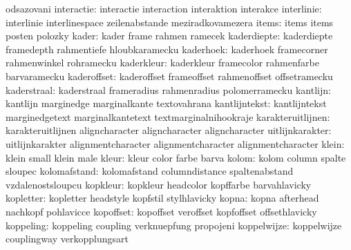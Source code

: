                        odsazovani
          interactie:  interactie           interaction          interaktion
                       interakce
          interlinie:  interlinie           interlinespace       zeilenabstande
                       meziradkovamezera
               items:  items                items                posten
                       polozky
               kader:  kader                frame                rahmen
                       ramecek
         kaderdiepte:  kaderdiepte          framedepth           rahmentiefe
                       hloubkaramecku
           kaderhoek:  kaderhoek            framecorner          rahmenwinkel
                       rohramecku
          kaderkleur:  kaderkleur           framecolor           rahmenfarbe
                       barvaramecku
         kaderoffset:  kaderoffset          frameoffset          rahmenoffset
                       offsetramecku
         kaderstraal:  kaderstraal          frameradius          rahmenradius
                       polomerramecku
            kantlijn:  kantlijn             marginedge           marginalkante
                       textovahrana
       kantlijntekst:  kantlijntekst        marginedgetext       marginalkantetext
                       textmarginalnihookraje 
   karakteruitlijnen:  karakteruitlijnen    aligncharacter       aligncharacter       
                       aligncharacter %
     uitlijnkarakter:  uitlijnkarakter      alignmentcharacter   alignmentcharacter       
                       alignmentcharacter %
               klein:  klein                small                klein
                       male
               kleur:  kleur                color                farbe
                       barva
               kolom:  kolom                column               spalte
                       sloupec
        kolomafstand:  kolomafstand         columndistance       spaltenabstand
                       vzdalenostsloupcu
            kopkleur:  kopkleur             headcolor            kopffarbe
                       barvahlavicky 
           kopletter:  kopletter            headstyle            kopfstil
                       stylhlavicky
               kopna:  kopna                afterhead            nachkopf
                       pohlavicce
           kopoffset:  kopoffset            veroffset            kopfoffset
                       offsethlavicky
           koppeling:  koppeling            coupling             verknuepfung
                       propojeni
         koppelwijze:  koppelwijze          couplingway          verkopplungsart
